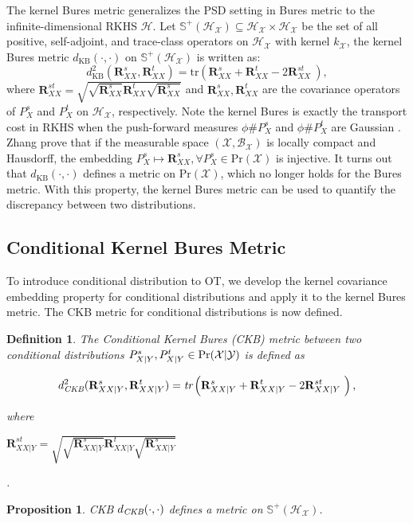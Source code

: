 \documentclass[final]{cvpr}
\newcommand{\MC}{\mathcal}
\newcommand{\MBB}{\mathbb}
\newcommand{\MBF}{\mathbf}
\newtheorem{definition}{Definition}
\newtheorem{proposition}{Proposition}
\begin{document}
The kernel Bures metric \cite{zhang2019optimal} generalizes the PSD setting in Bures metric to the infinite-dimensional RKHS $\MC{H}$. Let $\MBB{S}^+(\MC{H}_{\MC{X}}) \subseteq \MC{H}_{\MC{X}} \times \MC{H}_{\MC{X}}$ be the set of all positive, self-adjoint, and trace-class operators on $\MC{H}_{\MC{X}}$ with kernel $k_{\MC{X}}$, the kernel Bures metric $d_{\text{KB}}(\cdot,\cdot)$ on $\MBB{S}^+(\MC{H}_{\MC{X}})$ is written as:
\begin{equation*}\label{eq:kernel-bures_define}
d_{\text{KB}}^2(\MBF{R}^{s}_{XX},\MBF{R}^{t}_{XX}) = \text{tr} \left( \MBF{R}^{s}_{XX} + \MBF{R}^{t}_{XX} - 2\MBF{R}^{st}_{XX} ~\right),
\end{equation*}
where $\MBF{R}^{st}_{XX} = \sqrt{ \sqrt{\MBF{R}^{s}_{XX}} \MBF{R}^{t}_{XX} \sqrt{\MBF{R}^{s}_{XX}} }$ and $\MBF{R}^{s}_{XX}, \MBF{R}^{t}_{XX}$ are the covariance operators of $P^{s}_{X}$ and $P^{t}_{X}$ on $\MC{H}_{\MC{X}}$, respectively. Note the kernel Bures is exactly the transport cost in RKHS when the push-forward measures $\phi \# P^{s}_{X}$ and $\phi \# P^{t}_{X}$ are Gaussian \cite{zhang2019optimal}. Zhang \etal \cite{zhang2019optimal} prove that if the measurable space $(\MC{X},\MC{B}_{\MC{X}})$ is locally compact and Hausdorff, the embedding $P^{s}_{X} \mapsto \MBF{R}^{s}_{XX}, \forall P^{s}_{X} \in \text{Pr}(\MC{X})$ is injective. It turns out that $d_{\text{KB}}(\cdot,\cdot)$ defines a metric on $\text{Pr}(\MC{X})$, which no longer holds for the Bures metric. With this property, the kernel Bures metric can be used to quantify the discrepancy between two distributions.

\subsection{Conditional Kernel Bures Metric}
To introduce conditional distribution to OT, we develop the kernel covariance embedding property for conditional distributions and apply it to the kernel Bures metric. The CKB metric for conditional distributions is now defined.

\begin{definition}\label{def:conditional-kernel-bures}
The Conditional Kernel Bures (CKB) metric between two conditional distributions $P^{s}_{X|Y}, P^{t}_{X|Y} \in \rm{Pr}(\MC{X}|\MC{Y})$ is defined as
\begin{small}
\begin{equation}\label{eq:conditional-kernel-bures_define}
 d_{\emph{CKB}}^2(\MBF{R}^{s}_{XX|Y},\MBF{R}^{t}_{XX|Y}) =  \emph{tr} \left( \MBF{R}^{s}_{XX|Y} + \MBF{R}^{t}_{XX|Y} - 2\MBF{R}^{st}_{XX|Y} ~\right),
\end{equation}
\end{small}
where
\begin{small}
$\MBF{R}^{st}_{XX|Y}=\sqrt{ \sqrt{\MBF{R}^{s}_{XX|Y}} \MBF{R}^{t}_{XX|Y} \sqrt{\MBF{R}^{s}_{XX|Y}} }$
\end{small}
.
\end{definition}
\begin{proposition}\label{prop:CKB_define_metric}
CKB $d_{\emph{CKB}}(\cdot,\cdot)$ defines a metric on $\MBB{S}^+(\MC{H}_{\MC{X}})$.
\end{proposition}
\end{document}

